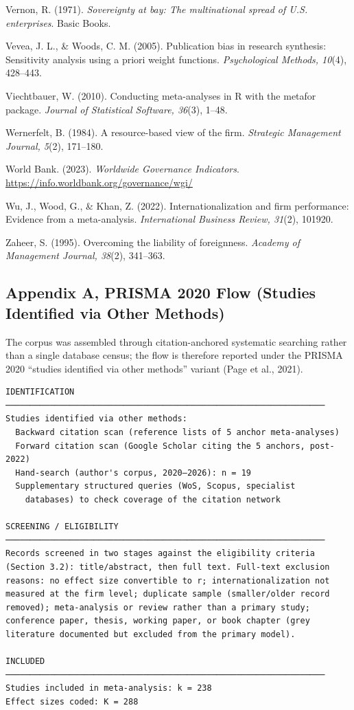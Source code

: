 \documentclass[
  12pt,a4paper]{article}
\begin{document}
Vernon, R. (1971). \emph{Sovereignty at bay: The multinational spread of
U.S. enterprises}. Basic Books.

Vevea, J. L., \& Woods, C. M. (2005). Publication bias in research
synthesis: Sensitivity analysis using a priori weight functions.
\emph{Psychological Methods, 10}(4), 428--443.

Viechtbauer, W. (2010). Conducting meta-analyses in R with the metafor
package. \emph{Journal of Statistical Software, 36}(3), 1--48.

Wernerfelt, B. (1984). A resource-based view of the firm.
\emph{Strategic Management Journal, 5}(2), 171--180.

World Bank. (2023). \emph{Worldwide Governance Indicators}.
\url{https://info.worldbank.org/governance/wgi/}

Wu, J., Wood, G., \& Khan, Z. (2022). Internationalization and firm
performance: Evidence from a meta-analysis. \emph{International Business
Review, 31}(2), 101920.

Zaheer, S. (1995). Overcoming the liability of foreignness.
\emph{Academy of Management Journal, 38}(2), 341--363.

\hypertarget{appendix-a-prisma-2020-flow-studies-identified-via-other-methods}{%
\subsection{Appendix A, PRISMA 2020 Flow (Studies Identified via Other
Methods)}\label{appendix-a-prisma-2020-flow-studies-identified-via-other-methods}}

The corpus was assembled through citation-anchored systematic searching
rather than a single database census; the flow is therefore reported
under the PRISMA 2020 ``studies identified via other methods'' variant
(Page et al., 2021).

\begin{verbatim}
IDENTIFICATION
─────────────────────────────────────────────────────────────────
Studies identified via other methods:
  Backward citation scan (reference lists of 5 anchor meta-analyses)
  Forward citation scan (Google Scholar citing the 5 anchors, post-2022)
  Hand-search (author's corpus, 2020–2026): n = 19
  Supplementary structured queries (WoS, Scopus, specialist
    databases) to check coverage of the citation network

SCREENING / ELIGIBILITY
─────────────────────────────────────────────────────────────────
Records screened in two stages against the eligibility criteria
(Section 3.2): title/abstract, then full text. Full-text exclusion
reasons: no effect size convertible to r; internationalization not
measured at the firm level; duplicate sample (smaller/older record
removed); meta-analysis or review rather than a primary study;
conference paper, thesis, working paper, or book chapter (grey
literature documented but excluded from the primary model).

INCLUDED
─────────────────────────────────────────────────────────────────
Studies included in meta-analysis: k = 238
Effect sizes coded: K = 288
\end{verbatim}
\end{document}
